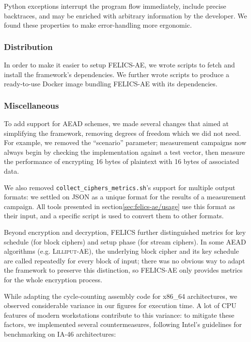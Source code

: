 \documentclass{article}
\begin{document}
Python exceptions interrupt the program flow immediately, include
precise backtraces, and may be enriched with arbitrary information by
the developer.  We found these properties to make error-handling more
ergonomic.

\subsubsection{Distribution}
\label{sec:felics-ae/distrib}

In order to make it easier to setup FELICS-AE, we wrote scripts to
fetch and install the framework's dependencies.  We further wrote
scripts to produce a ready-to-use Docker image bundling FELICS-AE with
its dependencies.

\subsubsection{Miscellaneous}
\label{sec:felics-ae/misc}

To add support for AEAD schemes, we made several changes that aimed at
simplifying the framework, removing degrees of freedom which we did
not need.  For example, we removed the ``scenario'' parameter;
measurement campaigns now always begin by checking the implementation
against a test vector, then measure the performance of encrypting 16
bytes of plaintext with 16 bytes of associated data.

We also removed \texttt{collect\_ciphers\_metrics.sh}'s support for
multiple output formats: we settled on JSON as a unique format for the
results of a measurement campaign.  All tools presented in
section\ref{sec:felics-ae/usage} use this format as their input, and a
specific script is used to convert them to other formats.

Beyond encryption and decryption, FELICS further distinguished metrics
for key schedule (for block ciphers) and setup phase (for stream
ciphers).  In some AEAD algorithms (e.g. \textsc{Lilliput-AE}), the
underlying block cipher and its key schedule are called repeatedly for
every block of input; there was no obvious way to adapt the framework
to preserve this distinction, so FELICS-AE only provides metrics for
the whole encryption process.

While adapting the cycle-counting assembly code for x86\_64
architectures, we observed considerable variance in our figures for
execution time.  A lot of CPU features of modern workstations
contribute to this variance: to mitigate these factors, we implemented
several countermeasures, following Intel's guidelines for benchmarking
on IA-46 architectures\cite{Intel:64bit-ISA-bench}:
\end{document}
